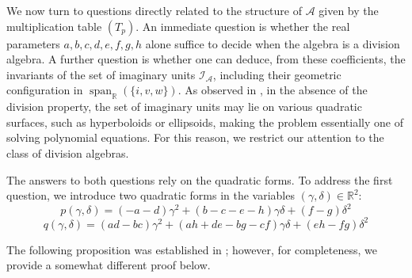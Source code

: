 \documentclass{amsart}
\theoremstyle{definition}
\theoremstyle{plain}
\begin{document}

We now turn to questions directly related to the structure of $\mathcal{A}$ given by the multiplication table $(T_p)$. An immediate question is whether the real parameters $a, b, c, d, e, f, g, h$ alone suffice to decide when the algebra is a division algebra. A further question is whether one can deduce, from these coefficients, the invariants of the set of imaginary units $\mathcal{I_A}$, including their geometric configuration in $\operatorname{span}_{\mathbb{R}}(\{i,v,w\})$. As observed in \cite{HNT}, in the absence of the division property, the set of imaginary units may lie on various quadratic surfaces, such as hyperboloids or ellipsoids, making the problem essentially one of solving polynomial equations. For this reason, we restrict our attention to the class of division algebras.

The answers to both questions rely on the quadratic forms. To address the first question, we introduce two quadratic forms in the variables $(\gamma,\delta)\in\mathbb R^2$:
$$p(\gamma,\delta)=(-a-d)\gamma^2+(b-c-e-h)\gamma\delta+(f-g)\delta^2$$
$$q(\gamma,\delta)=(ad-bc)\gamma^2+(ah+de-bg-cf)\gamma\delta+(eh-fg)\delta^2$$

The following proposition was established in \cite{GNT}; however, for completeness, we provide a somewhat different proof below.
\end{document}
